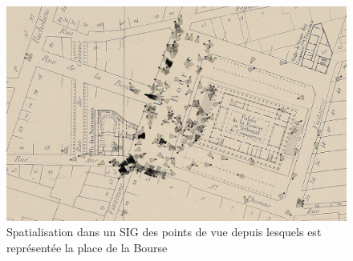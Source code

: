 \documentclass[11pt,french]{article}
\begin{document}
\clearpage
\begin{figure}[!p]
 \includegraphics[width=\textwidth]{includes/pdv.jpg}
 \caption{Spatialisation dans un SIG des points de vue depuis lesquels est représentée la place de la Bourse}
 \label{fig:pdv}
\end{figure}
\end{document}
